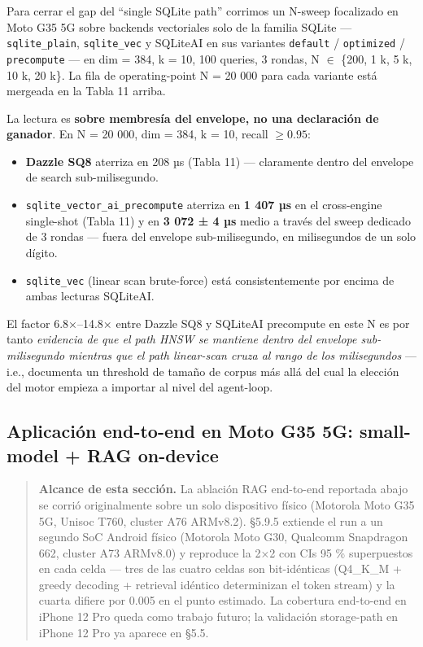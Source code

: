 Para cerrar el gap del ``single SQLite path'' corrimos un N-sweep focalizado en
Moto G35 5G sobre backends vectoriales solo de la familia SQLite ---
\texttt{sqlite\_plain}, \texttt{sqlite\_vec} y SQLiteAI en sus variantes
\texttt{default} / \texttt{optimized} / \texttt{precompute} --- en dim = 384, k
= 10, 100 queries, 3 rondas, N \(\in\) \{200, 1 k, 5 k, 10 k, 20 k\}. La fila de
operating-point N = 20 000 para cada variante está mergeada en la Tabla 11
arriba.

La lectura es \textbf{sobre membresía del envelope, no una declaración de
ganador}. En N = 20 000, dim = 384, k = 10, recall \(\geq 0.95\):

\begin{itemize}
\tightlist
\item
  \textbf{Dazzle SQ8} aterriza en 208 µs (Tabla 11) --- claramente dentro del
  envelope de search sub-milisegundo.
\item
  \texttt{sqlite\_vector\_ai\_precompute} aterriza en \textbf{1 407 µs} en el
  cross-engine single-shot (Tabla 11) y en \textbf{3 072 ± 4 µs} medio a través
  del sweep dedicado de 3 rondas --- fuera del envelope sub-milisegundo, en
  milisegundos de un solo dígito.
\item
  \texttt{sqlite\_vec} (linear scan brute-force) está consistentemente por
  encima de ambas lecturas SQLiteAI.
\end{itemize}

El factor 6.8×--14.8× entre Dazzle SQ8 y SQLiteAI precompute en este N es por
tanto \emph{evidencia de que el path HNSW se mantiene dentro del envelope
sub-milisegundo mientras que el path linear-scan cruza al rango de los
milisegundos} --- i.e., documenta un threshold de tamaño de corpus más allá del
cual la elección del motor empieza a importar al nivel del agent-loop.

\subsection{Aplicación end-to-end en Moto G35 5G: small-model + RAG
on-device}\label{aplicaciuxf3n-end-to-end-en-moto-g35-5g-small-model-rag-on-device}

\begin{quote}
\textbf{Alcance de esta sección.} La ablación RAG end-to-end reportada abajo se
corrió originalmente sobre un solo dispositivo físico (Motorola Moto G35 5G,
Unisoc T760, cluster A76 ARMv8.2). §5.9.5 extiende el run a un segundo SoC
Android físico (Motorola Moto G30, Qualcomm Snapdragon 662, cluster A73 ARMv8.0)
y reproduce la 2×2 con CIs 95 \% superpuestos en cada celda --- tres de las
cuatro celdas son bit-idénticas (Q4\_K\_M + greedy decoding + retrieval idéntico
determinizan el token stream) y la cuarta difiere por 0.005 en el punto
estimado. La cobertura end-to-end en iPhone 12 Pro queda como trabajo futuro; la
validación storage-path en iPhone 12 Pro ya aparece en §5.5.
\end{quote}


